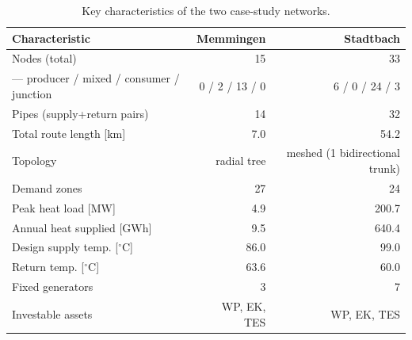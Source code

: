 \begin{table}[htbp]
  \centering
  \caption{Key characteristics of the two case-study networks.}
  \label{tab:t1_networks}
  \begin{tabular}{lrr}
  \toprule
  Characteristic & Memmingen & Stadtbach \\
  \midrule
  Nodes (total) & 15 & 33 \\
    — producer / mixed / consumer / junction & 0 / 2 / 13 / 0 & 6 / 0 / 24 / 3 \\
  Pipes (supply+return pairs) & 14 & 32 \\
  Total route length [km] & 7.0 & 54.2 \\
  Topology & radial tree & meshed (1 bidirectional trunk) \\
  Demand zones & 27 & 24 \\
  Peak heat load [MW] & 4.9 & 200.7 \\
  Annual heat supplied [GWh] & 9.5 & 640.4 \\
  Design supply temp. [$^\circ$C] & 86.0 & 99.0 \\
  Return temp. [$^\circ$C] & 63.6 & 60.0 \\
  Fixed generators & 3 & 7 \\
  Investable assets & WP, EK, TES & WP, EK, TES \\
  \bottomrule
  \end{tabular}
\end{table}

